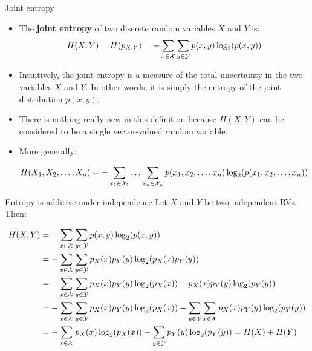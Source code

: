 \documentclass[11pt,compress,t,notes=noshow, xcolor=table]{beamer}
\begin{document}
\begin{vbframe} {Joint entropy}
\begin{itemize}
  \item The \textbf{joint entropy} of two discrete random variables $X$ and $Y$ is:
    $$ H(X,Y) = H(p_{X,Y}) = - \sum_{x \in \mathcal{X}} \sum_{y \in \mathcal{Y}}  p(x,y) \log_2(p(x,y))$$
  \item Intuitively, the joint entropy is a measure of the total uncertainty in the two variables $X$ and $Y$. In other words, it is simply the entropy of the joint distribution $p(x,y)$.
  \item There is nothing really new in this definition because $H(X, Y)$ can be considered to be a single vector-valued random variable.
  \item More generally:
    \begin{footnotesize}  
  $$ H(X_1, X_2, \ldots, X_n) = - \sum_{x_1 \in \mathcal{X}_1} \ldots \sum_{x_n \in \mathcal{X}_n} p(x_1,x_2, \ldots, x_n) \log_2(p(x_1,x_2, \ldots, x_n)) $$ 
    \end{footnotesize}  
\end{itemize}
\end{vbframe}

\begin{vbframe} {Entropy is additive under independence}
Let $X$ and $Y$ be two independent RVs. Then:
  \begin{footnotesize}
  \begin{equation*}
    \begin{aligned} 
     H(X,Y) &= - \sum_{x \in \mathcal{X}} \sum_{y \in \mathcal{Y}}  p(x,y) \log_2(p(x,y)) \\ 
            &= - \sum_{x \in \mathcal{X}} \sum_{y \in \mathcal{Y}}  p_X(x)p_Y(y) \log_2(p_X(x)p_Y(y)) \\
            &= - \sum_{x \in \mathcal{X}} \sum_{y \in \mathcal{Y}}  p_X(x)p_Y(y)\log_2(p_X(x)) + p_X(x)p_Y(y)\log_2(p_Y(y)) \\
            &= - \sum_{x \in \mathcal{X}} \sum_{y \in \mathcal{Y}}  p_X(x)p_Y(y)\log_2(p_X(x)) - \sum_{y \in \mathcal{Y}} \sum_{x \in \mathcal{X}} p_X(x)p_Y(y)\log_2(p_Y(y)) \\
            &= - \sum_{x \in \mathcal{X}} p_X(x)\log_2(p_X(x)) - \sum_{y \in \mathcal{Y}} p_Y(y)\log_2(p_Y(y)) = H(X) + H(Y)
    \end{aligned} 
  \end{equation*}
\end{footnotesize}
\end{vbframe}
\end{document}

